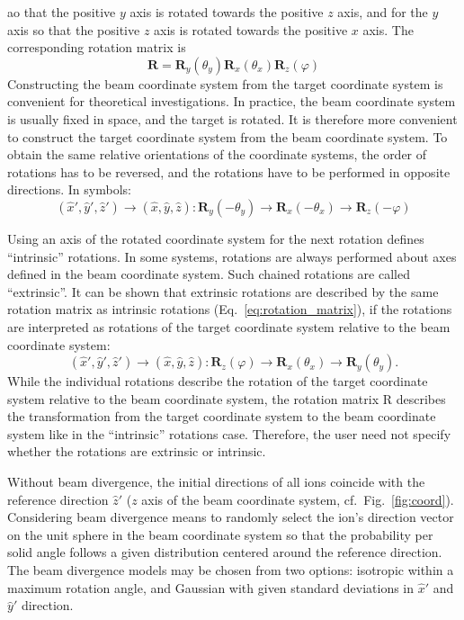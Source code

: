 ao that the positive $y$ axis is rotated towards the positive $z$ axis, and for 
the $y$ axis so that the positive $z$ axis is rotated towards the positive $x$
axis. The corresponding rotation matrix is
%
\begin{equation}
    \mathbf{R} = \mathbf{R}_y(\theta_y) \mathbf{R}_x(\theta_x) 
        \mathbf{R}_z(\varphi) 
    \label{eq:rotation_matrix}
\end{equation}
Constructing the beam coordinate system from the target coordinate system is 
convenient for theoretical investigations. In practice, the beam coordinate
system is usually fixed in space, and the target is rotated. It is therefore
more convenient to construct the target coordinate system from the beam
coordinate system. To obtain the same relative orientations of the coordinate 
systems, the order of rotations has to be reversed, and the rotations have to
be performed in opposite directions.
In symbols:
%
\begin{equation}
    (\hat{x}', \hat{y}', \hat{z}') \rightarrow (\hat{x}, \hat{y}, \hat{z}): 
        \textbf{R}_y(-\theta_y)
        \rightarrow \textbf{R}_x(-\theta_x)
        \rightarrow \textbf{R}_z(-\varphi) 
\end{equation}
%

Using an axis of the rotated coordinate system for the next rotation defines
``intrinsic'' rotations. In some systems, rotations are always performed
about axes defined in the beam coordinate system. Such chained rotations
are called ``extrinsic''. It can be shown that extrinsic rotations are 
described by the same rotation matrix as intrinsic rotations 
(Eq.~\ref{eq:rotation_matrix}), if the rotations are interpreted as rotations 
of the target coordinate system relative to the beam coordinate system:
%
\begin{equation}
    (\hat{x}', \hat{y}', \hat{z}') \rightarrow (\hat{x}, \hat{y}, \hat{z}): 
        \textbf{R}_z(\varphi) 
        \rightarrow \textbf{R}_x(\theta_x)
        \rightarrow \textbf{R}_y(\theta_y) .
\end{equation}
%
While the individual rotations describe the rotation of the target coordinate
system relative to the beam coordinate system, the rotation matrix 
$\mathrm{R}$ describes the transformation from the target coordinate system
to the beam coordinate system like in the ``intrinsic'' rotations case.
Therefore, the user need not specify whether the rotations are extrinsic or
intrinsic.

Without beam divergence, the initial directions of all ions coincide with
the reference direction $\hat{z}'$ ($z$ axis of the beam coordinate system, 
cf.\ Fig.~\ref{fig:coord}). Considering beam divergence means to randomly 
select the ion’s direction vector on the unit sphere in the beam coordinate
system so that the probability per solid angle follows a given distribution 
centered around the reference direction. The beam divergence models may be 
chosen from two options: isotropic within a maximum rotation angle, and 
Gaussian with given standard deviations in $\hat{x}'$ and $\hat{y}'$ 
direction.

